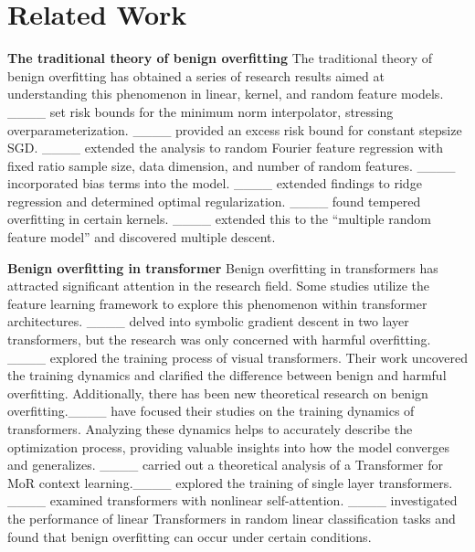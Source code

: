 \section{Related Work}
\textbf{The traditional theory of benign overfitting}   
The traditional theory of benign overfitting has obtained a series of research results aimed at understanding this phenomenon in linear, kernel, and random feature models. ____ set risk bounds for the minimum norm interpolator, stressing overparameterization. ____ provided an excess risk bound for constant stepsize SGD. ____ extended the analysis to random Fourier feature regression with fixed ratio sample size, data dimension, and number of random features. ____ incorporated bias terms into the model. ____ extended findings to ridge regression and determined optimal regularization. ____ found tempered overfitting in certain kernels. ____  extended this to the “multiple random feature model” and discovered multiple descent. 

\textbf{Benign overfitting in transformer}   Benign overfitting in transformers has attracted significant attention in the research field. Some studies utilize the feature learning framework to explore this phenomenon within transformer architectures. ____ delved into symbolic gradient descent in two layer transformers, but the research was only concerned with harmful overfitting. ____ explored the training process of visual transformers. Their work uncovered the training dynamics and clarified the difference between benign and harmful overfitting.  Additionally, there has been new theoretical research on benign overfitting.____ have focused their studies on the training dynamics of transformers. Analyzing these dynamics helps to accurately describe the optimization process, providing valuable insights into how the model converges and generalizes. ____ carried out a theoretical analysis of a Transformer for MoR context learning.____  explored the training of single layer transformers. ____  examined transformers with nonlinear self-attention. ____ investigated the performance of linear Transformers in random linear classification tasks and found that benign overfitting can occur under certain conditions.